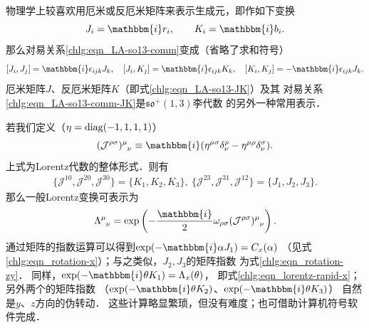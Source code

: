 物理学上较喜欢用厄米或反厄米矩阵来表示生成元，即作如下变换
\begin{equation}\label{chlg:eqn_LA-so13-JK}
    J_i = \mathbbm{i} r_i,\qquad  K_i = \mathbbm{i} b_i .
\end{equation}
那么对易关系\eqref{chlg:eqn_LA-so13-comm}变成（省略了求和符号）
\begin{equation}\label{chlg:eqn_LA-so13-comm-JK}
    [J_i, J_j] = \mathbbm{i} \epsilon_{ijk} J_k,\quad
    [J_i, K_j] = \mathbbm{i} \epsilon_{ijk} K_k,\quad
    [K_i, K_j] = -\mathbbm{i}\epsilon_{ijk} J_k.
\end{equation}
厄米矩阵$J$、反厄米矩阵$K$（即式\eqref{chlg:eqn_LA-so13-JK}）及其
对易关系\eqref{chlg:eqn_LA-so13-comm-JK}是$\mathfrak{so}^{+}(1,3)$李代数
的另外一种常用表示．


若我们定义（$\eta={\rm diag}(-1,1,1,1)$）
\begin{equation}\label{chlg:eqn_LJw}
    (\mathcal{J}^{\rho\sigma})^\mu_{\hphantom{\mu}\nu} \equiv 
    \mathbbm{i} ( \eta^{\mu\sigma} \delta^\rho_\nu -\eta^{\mu\rho} \delta^\sigma_\nu).
\end{equation}
上式为Lorentz代数的整体形式．则有
\begin{align}
    \{\mathcal{J}^{10},\mathcal{J}^{20},\mathcal{J}^{30} \} =\{K_1,K_2,K_3\}, \
    \{\mathcal{J}^{23},\mathcal{J}^{31},\mathcal{J}^{12} \} =\{J_1,J_2,J_3\}.
\end{align}
那么一般Lorentz变换可表示为
\begin{equation}
    \Lambda^\mu_{\hphantom{\mu}\nu} = \exp\left( -\frac{\mathbbm{i}}{2}\omega_{\rho\sigma}
    (\mathcal{J}^{\rho\sigma})^\mu_{\hphantom{\mu}\nu} \right) .
\end{equation}
通过矩阵的指数运算可以得到$\exp(-\mathbbm{i} \alpha J_1)= C_x(\alpha)$
（见式\eqref{chlg:eqn_rotation-x}）；与之类似，$J_2,J_3$的矩阵指数
为式\eqref{chlg:eqn_rotation-zy}．
同样，$\exp(-\mathbbm{i} \theta K_1)= \Lambda_x(\theta)$，
即式\eqref{chlg:eqn_lorentz-rapid-x}；另外两个的矩阵指数
（$\exp(-\mathbbm{i} \theta K_2)$、$\exp(-\mathbbm{i} \theta K_3)$）
自然是$y$、$z$方向的伪转动．
这些计算略显繁琐，但没有难度；也可借助计算机符号软件完成．


